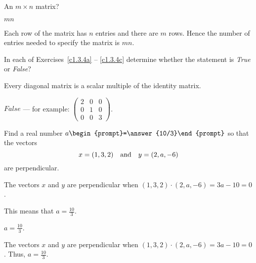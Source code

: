 \documentclass{ximera}
\begin{document}



\problemlabel

\begin{exercise}  \label{c1.3.2}
An $m\times n$ matrix?

\begin{solution}
\ans $mn$

\soln Each row of the matrix has $n$ entries and there are $m$ rows.  Hence the number of entries needed to specify the matrix is $mn$.

\end{solution}
\end{exercise}





\problemlabel

\noindent In each of Exercises~\ref{c1.3.4a} -- \ref{c1.3.4c} determine
whether the statement is {\em True\/} or {\em False\/}?


\begin{exercise} \label{c1.3.4b}
  Every diagonal matrix is a scalar multiple of the identity matrix.

\begin{solution}
\ans $False$ --- for example:
$\left(\begin{array}{ccc}
2 & 0 & 0 \\
0 & 1 & 0 \\
0 & 0 & 3 \end{array}\right)$.

\end{solution}
\end{exercise}





\problemlabel

\begin{exercise} \label{c1.4.2}
Find a real number $a\begin{prompt}=\answer{10/3}\end{prompt}$ so that the vectors
\[
x = (1,3,2) \quad\mbox{and}\quad y = (2,a,-6)
\]
are perpendicular.
\begin{hint}
  The vectors $x$ and $y$ are perpendicular when
$(1,3,2) \cdot (2,a,-6) = 3a - 10 = 0$.
\end{hint}
\begin{hint}
  This means that $a = \frac{10}{3}$.
\end{hint}

\begin{solution}
\ans $a = \frac{10}{3}$.

\soln The vectors $x$ and $y$ are perpendicular when $(1,3,2) \cdot (2,a,-6) = 3a - 10 = 0$.  Thus, $a = \frac{10}{3}$.

\end{solution}
\end{exercise}
\end{document}
